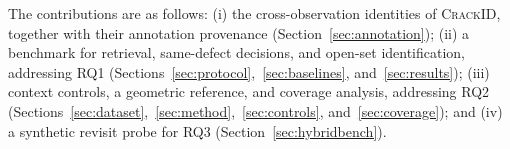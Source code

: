 The contributions are as follows:
(i) the cross-observation identities of \textsc{CrackID}, together with their annotation provenance (Section~\ref{sec:annotation});
(ii) a benchmark for retrieval, same-defect decisions, and open-set identification, addressing RQ1 (Sections~\ref{sec:protocol},~\ref{sec:baselines}, and~\ref{sec:results});
(iii) context controls, a geometric reference, and coverage analysis, addressing RQ2 (Sections~\ref{sec:dataset},~\ref{sec:method},~\ref{sec:controls}, and~\ref{sec:coverage}); and
(iv) a synthetic revisit probe for RQ3 (Section~\ref{sec:hybridbench}).
